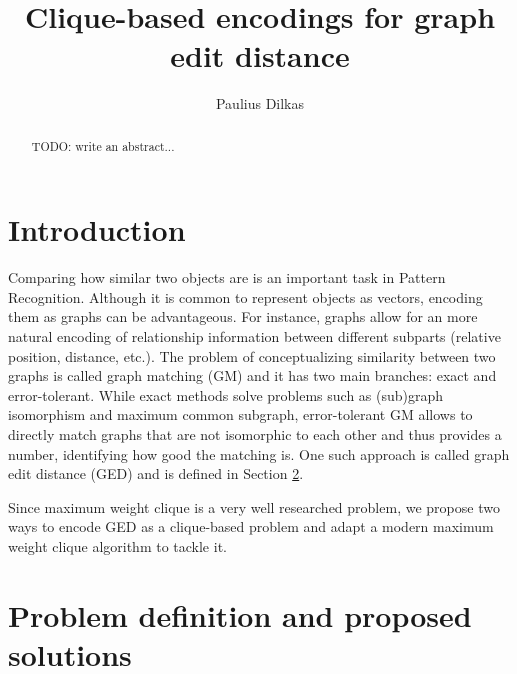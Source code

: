 \documentclass{article}
\author{Paulius Dilkas}
\title{Clique-based encodings for graph edit distance}
\theoremstyle{definition}
\begin{document}
\maketitle
\begin{abstract}
  TODO: write an abstract...
\end{abstract}
\section{Introduction}
Comparing how similar two objects are is an important task in Pattern Recognition. Although it is common to represent objects as vectors, encoding them as graphs can be advantageous. For instance, graphs allow for an more natural encoding of relationship information between different subparts (relative position, distance, etc.). The problem of conceptualizing similarity between two graphs is called graph matching (GM) and it has two main branches: exact and error-tolerant. While exact methods solve problems such as (sub)graph isomorphism and maximum common subgraph, error-tolerant GM allows to directly match graphs that are not isomorphic to each other and thus provides a number, identifying how good the matching is. One such approach is called graph edit distance (GED) and is defined in Section \ref{sec:2}.

Since maximum weight clique is a very well researched problem, we propose two ways to encode GED as a clique-based problem and adapt a modern maximum weight clique algorithm to tackle it.
\section{Problem definition and proposed solutions}
\label{sec:2}
\end{document}
